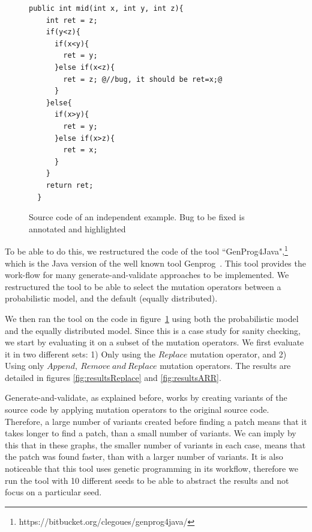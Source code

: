 \documentclass[conference]{IEEEtran}
\begin{document}

\begin{figure}[t]
\begin{lstlisting}[frame=single,style=base]
  public int mid(int x, int y, int z){
    int ret = z;  
    if(y<z){
      if(x<y){
        ret = y;
      }else if(x<z){
        ret = z; @//bug, it should be ret=x;@
      }
    }else{
      if(x>y){
        ret = y;
      }else if(x>z){
        ret = x;
      }
    }
    return ret;
  }	
	\end{lstlisting}
	\caption{Source code of an independent example. Bug to be fixed is annotated and highlighted}
	\label{fig:initialExample}
\end{figure}




To be able to do this, we restructured the code of the tool ``GenProg4Java",\footnote{https://bitbucket.org/clegoues/genprog4java/} which is the Java version of the 
well known tool Genprog~\cite{legoues12}. This tool provides the work-flow 
for many generate-and-validate approaches to be implemented. We restructured the 
tool to be able to select the mutation operators between a 
probabilistic model, and the default (equally distributed).

We then ran the tool on the code in figure~\ref{fig:initialExample} using both 
the probabilistic model and the equally distributed model. Since this is a 
case study for sanity checking, we start by evaluating it on a subset of 
the mutation operators. We first evaluate it in two different sets: 1) Only using the $Replace$ mutation operator, and 2) Using only $Append,~
Remove~and~Replace$ mutation operators. The results are detailed in figures 
\ref{fig:resultsReplace} and \ref{fig:resultsARR}. 

Generate-and-validate, as explained before, works by creating variants of the 
source code by applying mutation operators to the original source code. 
Therefore, a large number of variants created before finding a patch means that 
it takes longer to find a patch, than a small number of variants. We can imply by this 
that in these graphs, the smaller number of variants in each case, means that 
the patch was found faster, than with a larger number of variants. It is also 
noticeable that this tool uses genetic programming in its workflow, therefore we 
run the tool with 10 different seeds to be able to abstract the results 
and not focus on a particular seed.
\end{document}
